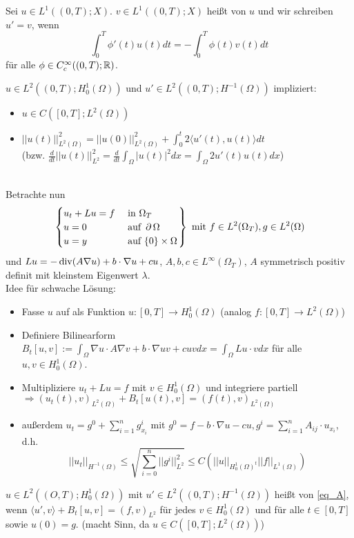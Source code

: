 \begin{defn}
	Sei $u \in L^1((0,T);X)$. $v \in L^1((0,T);X)$ heißt  von $u$ und wir schreiben $u' = v$, wenn
	\[ \int_{0}^{T} \phi'(t) u(t) dt = -\int_{0}^{T} \phi(t) v(t) dt \]
	für alle $\phi \in C_c^\infty ((0,T);\mathbb{R})$.
\end{defn}
	
\begin{bem}
	$u \in L^2((0,T);H_0^1(\Omega))$ und $u' \in L^2((0,T);H^{-1}(\Omega))$ impliziert: \begin{itemize}
		\item $u \in C([0,T];L^2(\Omega))$
		\item $||u(t)||_{L^2(\Omega)}^2 = ||u(0)||_{L^2(\Omega)}^2 + \int_0^t 2 \langle u'(t),u(t) \rangle dt$ \\
		(bzw. $\frac{d}{dt} ||u(t)||_{L^2}^2 = \frac{d}{dt} \int_{\Omega} |u(t)|^2 dx = \int_{\Omega} 2u'(t)u(t) dx$)
	\end{itemize}
\end{bem}
	
\mbox{} \\
Betrachte nun
\begin{equation} \left. \begin{cases}
	u_t + Lu = f & \text{ in } \Omega_T \\
	u = 0 & \text{ auf } \operatorname{\partial} \Omega \\
	u = y & \text{ auf } \{0\} \times \Omega \end{cases} \right\} \text{ mit } f \in L^2(\Omega_T), g \in L^2(\Omega) \label{eq_A} \end{equation}
und $Lu = -\operatorname{div} (A \nabla u) + b \cdot \nabla u + cu$, $A,b,c \in L^\infty(\Omega_T)$, $A$ symmetrisch positiv definit mit kleinstem Eigenwert $\lambda$. \\
Idee für schwache Lösung: \begin{itemize}
	\item Fasse $u$ auf als Funktion $u\colon [0,T] \rightarrow H_0^1(\Omega)$ (analog $f \colon [0,T] \rightarrow L^2(\Omega)$)
	\item Definiere Bilinearform $B_t[u,v] := \int_{\Omega} \nabla u \cdot A \nabla v + b \cdot \nabla uv + cuv dx = \int_{\Omega} Lu \cdot v dx$ für alle $u,v \in H_0^1(\Omega)$.
	\item Multipliziere $u_t + Lu = f$ mit $v \in H_0^1(\Omega)$ und integriere partiell \\
	$\Rightarrow (u_t(t),v)_{L^2(\Omega)} + B_t[u(t),v] = (f(t),v)_{L^2(\Omega)}$
	\item außerdem $u_t = g^0 + \sum_{i=1}^{n} g_{x_i}^i$ mit $g^0 = f - b \cdot \nabla u - cu, g^i = \sum_{i=1}^{n} A_{ij} \cdot u_{x_i}$, d.h.
	\[ ||u_t||_{H^{-1}(\Omega)} \leq \sqrt{ \sum_{i=0}^{n} ||g^i||_{L^2}^2} \leq C( ||u||_{H_0^1(\Omega)^t} ||f||_{L^1(\Omega)}) \]
\end{itemize}
$u \in L^2((O,T);H_0^1(\Omega))$ mit $u' \in L^2((0,T);H^{-1}(\Omega))$ heißt  von \eqref{eq_A}, wenn $\langle u',v \rangle + B_t[u,v] = (f,v)_{L^2}$ für jedes $v \in H_0^1(\Omega)$ und für alle $t \in [0,T]$ sowie $u(0) = g$. (macht Sinn, da $u \in C([0,T];L^2(\Omega))$)

